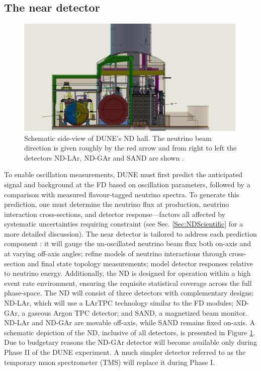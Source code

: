 \subsection{The near detector}
\label{Sec:Near}

\begin{figure}[!h]
     \centering
     \includegraphics[width=0.99\textwidth]{figures/ch3-DUNE/ndhall.JPG}
     \caption[Schematic side-view of DUNE's ND hall.]{Schematic side-view of DUNE's ND hall. The neutrino beam direction is given roughly by the red arrow and from right to left the detectors ND-LAr, ND-GAr and SAND are shown \cite{Battisti:2022ND}.}
        \label{fig:NDhall}
\end{figure}

To enable oscillation measurements, DUNE must first predict the anticipated signal and background at the FD based on oscillation parameters, followed by a comparison with measured flavour-tagged neutrino spectra. To generate this prediction, one must determine the neutrino flux at production, neutrino interaction cross-sections, and detector response—factors all affected by systematic uncertainties requiring constraint (see Sec. \ref{Sec:NDScientific} for a more detailed discussion). The near detector is tailored to address each prediction component \cite{DUNE:2021NDCDR}: it will gauge the un-oscillated neutrino beam flux both on-axis and at varying off-axis angles; refine models of neutrino interactions through cross-section and final state topology measurements; model detector responses relative to neutrino energy. Additionally, the ND is designed for operation within a high event rate environment, ensuring the requisite statistical coverage across the full phase-space. The ND will consist of three detectors with complementary designs: ND-LAr, which will use a LArTPC technology similar to the FD modules; ND-GAr, a gaseous Argon TPC detector; and SAND, a magnetized beam monitor. ND-LAr and ND-GAr are movable off-axis, while SAND remains fixed on-axis. A schematic depiction of the ND, inclusive of all detectors, is presented in Figure \ref{fig:NDhall}. Due to budgetary reasons the ND-GAr detector will become available only during Phase II of the DUNE experiment. A much simpler detector referred to as the temporary muon spectrometer (TMS) will replace it during Phase I. 

